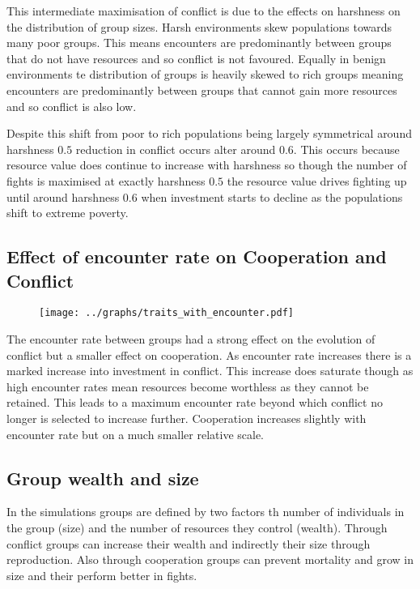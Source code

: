This intermediate maximisation of conflict is due to the effects on harshness on the distribution of group sizes. Harsh environments skew populations towards many poor groups. This means encounters are predominantly between groups that do not have resources and so conflict is not favoured. Equally in benign environments te distribution of groups is heavily skewed to rich groups meaning encounters are predominantly between groups that cannot gain more resources and so conflict is also low. 

Despite this shift from poor to rich populations being largely symmetrical around harshness $0.5$ reduction in conflict occurs alter around $0.6$. This occurs because resource value does continue to increase with harshness so though the number of fights is maximised at exactly harshness $0.5$ the resource value drives fighting up until around harshness $0.6$ when investment starts to decline as the populations shift to extreme poverty. 

\subsection{Effect of encounter rate on Cooperation and Conflict}
\begin{figure}[th]
    \texttt{[image: ../graphs/traits\_with\_encounter.pdf]}
    \caption{}
    \label{fig:traits_encounter}
\end{figure}
The encounter rate between groups had a strong effect on the evolution of conflict but a smaller effect on cooperation. As encounter rate increases there is a marked increase into investment in conflict. This increase does saturate though as high encounter rates mean resources become worthless as they cannot be retained. This leads to a maximum encounter rate beyond which conflict no longer is selected to increase further. Cooperation increases slightly with encounter rate but on a much smaller relative scale. 

\subsection{Group wealth and size}
In the simulations groups are defined by two factors th number of individuals in the group (size) and the number of resources they control (wealth). Through conflict groups can increase their wealth and indirectly their size through reproduction. Also through cooperation groups can prevent mortality and grow in size and their perform better in fights. 

